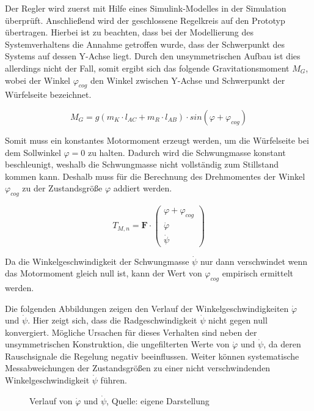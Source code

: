 Der Regler wird zuerst mit Hilfe eines Simulink-Modelles in der Simulation überprüft. Anschließend wird der geschlossene Regelkreis auf den Prototyp übertragen. Hierbei ist zu beachten, dass bei der Modellierung des Systemverhaltens die Annahme getroffen wurde, dass der Schwerpunkt des Systems auf dessen Y-Achse liegt. Durch den unsymmetrischen Aufbau ist dies allerdings nicht der Fall, somit ergibt sich das folgende Gravitationsmoment  $M_G$, wobei der Winkel $\varphi_{cog}$ den Winkel zwischen Y-Achse und Schwerpunkt der Würfelseite bezeichnet.

\begin{equation}
M_G = g(m_K \cdot l_{AC} + m_R \cdot l_{AB}) \cdot sin(\varphi + \varphi_{cog})
\end{equation}

Somit muss ein konstantes Motormoment erzeugt werden, um die Würfelseite bei dem Sollwinkel $\varphi = 0$ zu halten. Dadurch wird die Schwungmasse konstant beschleunigt, weshalb die Schwungmasse nicht vollständig zum Stillstand kommen kann. Deshalb muss für die Berechnung des Drehmomentes der Winkel $\varphi_{cog}$ zu der Zustandsgröße $\varphi$ addiert werden.

\begin{equation}
T_{M,n} = \boldsymbol{F} \cdot \begin{pmatrix}
\varphi + \varphi_{cog} \\
\dot{\varphi} \\
\dot{\psi}
\end{pmatrix}
\end{equation}

Da die Winkelgeschwindigkeit der Schwungmasse $\dot{\psi}$ nur dann verschwindet wenn das Motormoment gleich null ist, kann der Wert von $\varphi_{cog}$ empirisch ermittelt werden.

Die folgenden Abbildungen zeigen den Verlauf der Winkelgeschwindigkeiten $\dot{\varphi}$ und $\dot{\psi}$. Hier zeigt sich, dass die Radgeschwindigkeit $\dot{\psi}$ nicht gegen null konvergiert. Mögliche Ursachen für dieses Verhalten sind neben der unsymmetrischen Konstruktion, die ungefilterten Werte von $\dot{\varphi}$ und $\dot{\psi}$, da deren Rauschsignale die Regelung negativ beeinflussen. Weiter können systematische Messabweichungen der Zustandsgrößen zu einer nicht verschwindenden Winkelgeschwindigkeit $\dot{\psi}$ führen.

\begin{figure}[h]
\centering
\caption{Verlauf von $\dot{\varphi}$ und $\dot{\psi}$, Quelle: eigene Darstellung}
\end{figure}

